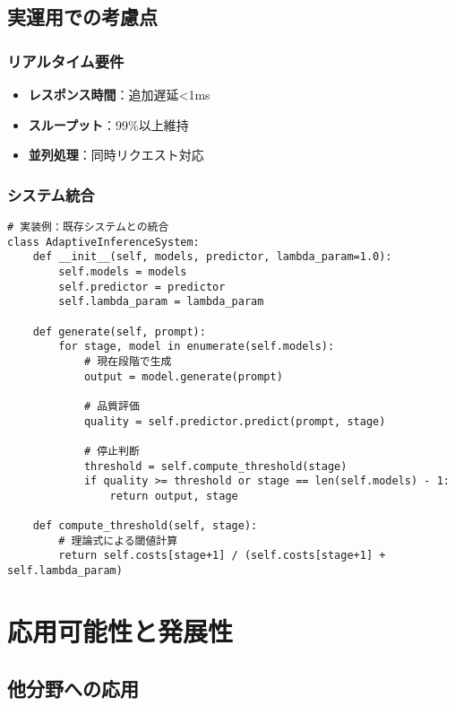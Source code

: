 \documentclass[a4paper,12pt]{jsarticle}
\begin{document}
\subsection{実運用での考慮点}

\subsubsection{リアルタイム要件}

\begin{itemize}
\item \textbf{レスポンス時間}：追加遅延<1ms
\item \textbf{スループット}：99\%以上維持
\item \textbf{並列処理}：同時リクエスト対応
\end{itemize}

\subsubsection{システム統合}

\begin{lstlisting}[style=pythonstyle]
# 実装例：既存システムとの統合
class AdaptiveInferenceSystem:
    def __init__(self, models, predictor, lambda_param=1.0):
        self.models = models
        self.predictor = predictor
        self.lambda_param = lambda_param
    
    def generate(self, prompt):
        for stage, model in enumerate(self.models):
            # 現在段階で生成
            output = model.generate(prompt)
            
            # 品質評価
            quality = self.predictor.predict(prompt, stage)
            
            # 停止判断
            threshold = self.compute_threshold(stage)
            if quality >= threshold or stage == len(self.models) - 1:
                return output, stage
    
    def compute_threshold(self, stage):
        # 理論式による閾値計算
        return self.costs[stage+1] / (self.costs[stage+1] + self.lambda_param)
\end{lstlisting}

\section{応用可能性と発展性}

\subsection{他分野への応用}
\end{document}
